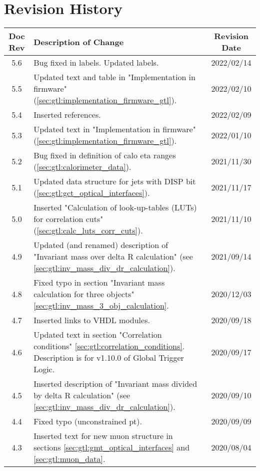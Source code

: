 \section*{Revision History}
\label{sec:revision_history}

\begin{longtable}{|c|p{}|c|}
\hline
Doc Rev & Description of Change & Revision Date\\
\hline
\hline
\endhead
5.6 & Bug fixed in labels. Updated labels. & 2022/02/14\\
5.5 & Updated text and table in "Implementation in firmware" (\ref{sec:gtl:implementation_firmware_gtl}). & 2022/02/10\\
5.4 & Inserted references. & 2022/02/09\\
5.3 & Updated text in "Implementation in firmware" (\ref{sec:gtl:implementation_firmware_gtl}). & 2022/01/10\\
5.2 & Bug fixed in definition of calo eta ranges (\ref{sec:gtl:calorimeter_data}). & 2021/11/30\\
5.1 & Updated data structure for jets with DISP bit (\ref{sec:gtl:gct_optical_interfaces}). & 2021/11/17\\
5.0 & Inserted "Calculation of look-up-tables (LUTs) for correlation cuts" (\ref{sec:gtl:calc_luts_corr_cuts}). & 2021/11/10\\
4.9 & Updated (and renamed) description of "Invariant mass over delta R calculation" (see \ref{sec:gtl:inv_mass_div_dr_calculation}). & 2021/09/14\\
4.8 & Fixed typo in section "Invariant mass calculation for three objects" \ref{sec:gtl:inv_mass_3_obj_calculation}. & 2020/12/03\\
4.7 & Inserted links to VHDL modules. & 2020/09/18\\
4.6 & Updated text in section "Correlation conditions" \ref{sec:gtl:correlation_conditions}. Description is for v1.10.0 of Global Trigger Logic. & 2020/09/17\\
4.5 & Inserted description of "Invariant mass divided by delta R calculation" (see \ref{sec:gtl:inv_mass_div_dr_calculation}). & 2020/09/10\\
4.4 & Fixed typo (unconstrained pt). & 2020/09/09\\
4.3 & Inserted text for new muon structure in sections \ref{sec:gtl:gmt_optical_interfaces} and \ref{sec:gtl:muon_data}. & 2020/08/04\\

\end{longtable}
